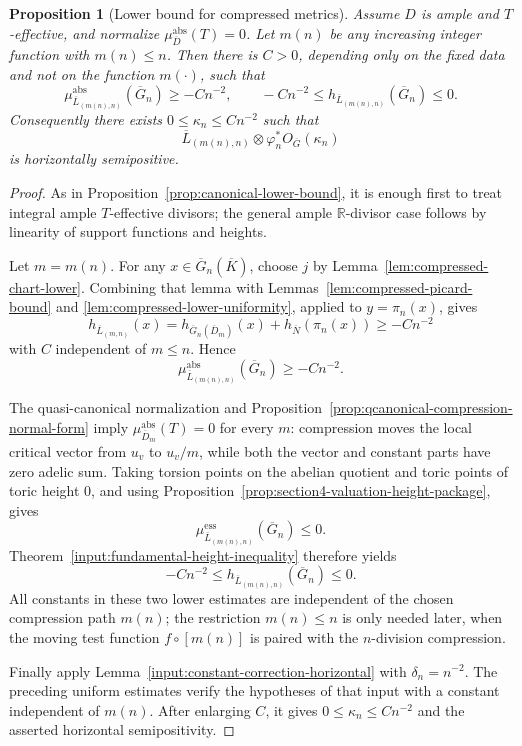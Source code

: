 \documentclass[10pt,a4paper]{amsart}
\theoremstyle{plain}
\newtheorem{proposition}[theorem]{Proposition}
\theoremstyle{plain}
\numberwithin{equation}{section}
\providecommand{\bR}{\mathbb{R}}
\providecommand{\ol}{\overline}
\providecommand{\muess}{\mu^{\mathrm{ess}}}
\providecommand{\muabs}{\mu^{\mathrm{abs}}}
\begin{document}
\begin{proposition}[Lower bound for compressed metrics]
	\label{prop:compressed-lower-bound}
	Assume \(D\) is ample and \(T\)-effective, and normalize
	\(\mu_{\ol D}^{\mathrm{abs}}(T)=0\).  Let \(m(n)\) be any increasing integer
	function with \(m(n)\le n\).  Then there is \(C>0\), depending only on the fixed
	data and not on the function \(m(\cdot)\), such that
	\[
	\mu^{\mathrm{abs}}_{\ol L_{(m(n),n)}}(\ol G_n)\ge -Cn^{-2},
	\qquad
	-Cn^{-2}\le h_{\ol L_{(m(n),n)}}(\ol G_n)\le 0.
	\]
	Consequently there exists \(0\le\kappa_n\le Cn^{-2}\) such that
	\[
	\ol L_{(m(n),n)}\otimes\varphi_n^*O_{\ol G}(\kappa_n)
	\]
	is horizontally semipositive.
\end{proposition}

\begin{proof}
	As in Proposition~\ref{prop:canonical-lower-bound}, it is enough first to treat
	integral ample \(T\)-effective divisors; the general ample \(\bR\)-divisor case
	follows by linearity of support functions and heights.
	
	Let \(m=m(n)\).  For any \(x\in\overline G_n(\overline K)\), choose \(j\) by
	Lemma~\ref{lem:compressed-chart-lower}.  Combining that lemma with
	Lemmas~\ref{lem:compressed-picard-bound} and
	\ref{lem:compressed-lower-uniformity}, applied to \(y=\pi_n(x)\), gives
	\[
	h_{\ol L_{(m,n)}}(x)
	=h_{\ol G_n(\ol D_m)}(x)+h_{\ol N}(\pi_n(x))
	\ge -Cn^{-2}
	\]
	with \(C\) independent of \(m\le n\).  Hence
	\[
	\mu^{\mathrm{abs}}_{\ol L_{(m(n),n)}}(\ol G_n)\ge -Cn^{-2}.
	\]
	
	The quasi-canonical normalization and
	Proposition~\ref{prop:qcanonical-compression-normal-form} imply
	\(\muabs_{\ol D_m}(T)=0\) for every \(m\): compression moves the local critical
	vector from \(u_v\) to \(u_v/m\), while both the vector and constant parts have
	zero adelic sum.  Taking torsion points on the abelian quotient and toric
	points of toric height \(0\), and using
	Proposition~\ref{prop:section4-valuation-height-package}, gives
	\[
	\muess_{\ol L_{(m(n),n)}}(\ol G_n)\le0 .
	\]
	Theorem~\ref{input:fundamental-height-inequality} therefore yields
	\[
	-Cn^{-2}\le h_{\ol L_{(m(n),n)}}(\ol G_n)\le0.
	\]
	All constants in these two lower estimates are independent of the chosen
	compression path \(m(n)\); the restriction \(m(n)\le n\) is only needed later,
	when the moving test function \(f\circ[m(n)]\) is paired with the
	\(n\)-division compression.
	
	Finally apply Lemma~\ref{input:constant-correction-horizontal} with
	\(\delta_n=n^{-2}\).  The preceding uniform estimates verify the hypotheses of
	that input with a constant independent of \(m(n)\).  After enlarging \(C\), it
	gives \(0\le\kappa_n\le Cn^{-2}\) and the asserted horizontal semipositivity.
\end{proof}
\end{document}
